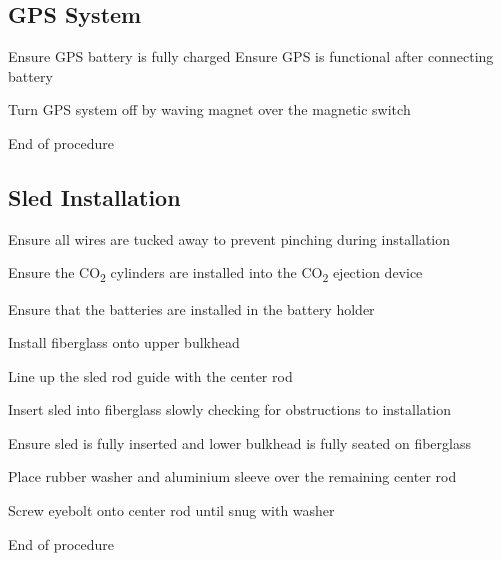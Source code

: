     \subsection{GPS System}
        \begin{checklist}
            \item Ensure GPS battery is fully charged
            Ensure GPS is functional after connecting battery
            \item Turn GPS system off by waving magnet over the magnetic switch
            \item End of procedure
        \end{checklist}

    \subsection{Sled Installation}
        \begin{checklist}
            \item Ensure all wires are tucked away to prevent pinching during installation
            \item Ensure the CO\textsubscript{2} cylinders are installed into the CO\textsubscript{2} ejection device
            \item Ensure that the batteries are installed in the battery holder
            \item Install fiberglass onto upper bulkhead
            \item Line up the sled rod guide with the center rod
            \item Insert sled into fiberglass slowly checking for obstructions to installation
            \item Ensure sled is fully inserted and lower bulkhead is fully seated on fiberglass
            \item Place rubber washer and aluminium sleeve over the remaining center rod
            \item Screw eyebolt onto center rod until snug with washer
            \item End of procedure
        \end{checklist}

